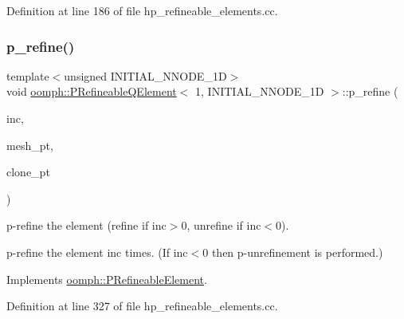 Definition at line 186 of file hp\+\_\+refineable\+\_\+elements.\+cc.

\mbox{\label{classoomph_1_1PRefineableQElement_3_011_00_01INITIAL__NNODE__1D_01_4_ab3210a40d15dd21dd3befee2220eca95}} 
\subsubsection{\texorpdfstring{p\+\_\+refine()}{p\_refine()}}
{\footnotesize\ttfamily template$<$unsigned I\+N\+I\+T\+I\+A\+L\+\_\+\+N\+N\+O\+D\+E\+\_\+1D$>$ \\
void \hyperlink{classoomph_1_1PRefineableQElement}{oomph\+::\+P\+Refineable\+Q\+Element}$<$ 1, I\+N\+I\+T\+I\+A\+L\+\_\+\+N\+N\+O\+D\+E\+\_\+1D $>$\+::p\+\_\+refine (\begin{DoxyParamCaption}\item[{const int \&}]{inc,  }\item[{\hyperlink{classoomph_1_1Mesh}{Mesh} $\ast$const \&}]{mesh\+\_\+pt,  }\item[{\hyperlink{classoomph_1_1GeneralisedElement}{Generalised\+Element} $\ast$const \&}]{clone\+\_\+pt }\end{DoxyParamCaption})\hspace{0.3cm}{\ttfamily [virtual]}}



p-\/refine the element (refine if inc$>$0, unrefine if inc$<$0). 

p-\/refine the element inc times. (If inc$<$0 then p-\/unrefinement is performed.) 

Implements \hyperlink{classoomph_1_1PRefineableElement_a706db9352965197a215405f620b3cedc}{oomph\+::\+P\+Refineable\+Element}.



Definition at line 327 of file hp\+\_\+refineable\+\_\+elements.\+cc.



